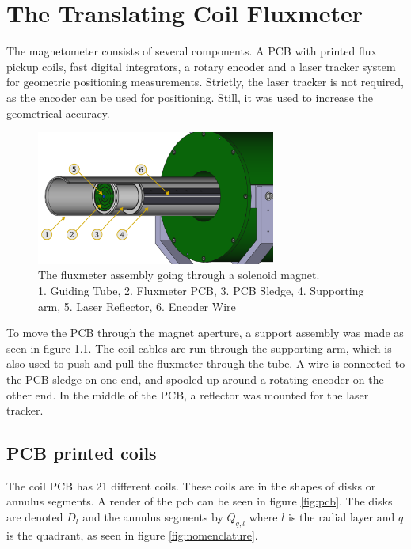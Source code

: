 \chapter{The Translating Coil Fluxmeter}
The magnetometer consists of several components. A PCB with 
printed flux pickup coils, fast digital integrators, a rotary
encoder and a laser tracker system for geometric positioning measurements.
Strictly, the laser tracker is not required, as the encoder can be used
for positioning. Still, it was used to increase
the geometrical accuracy.

\begin{figure}[!h]
    \centering
    \includegraphics[width=0.7\textwidth]{figs/elena}
    \caption{The fluxmeter assembly going through a solenoid magnet. \\
    1. Guiding Tube, 2. Fluxmeter PCB, 3. PCB Sledge, 4. Supporting arm, 
    5. Laser Reflector, 6. Encoder Wire}
    \label{fig:elena}
\end{figure}

To move the PCB through the magnet aperture, a support assembly was made as
seen in figure \ref{fig:elena}. The coil cables are run through the supporting
arm, which is also used to push and pull the fluxmeter through the tube. A 
wire is connected to the PCB sledge on one end, and spooled up around
a rotating encoder on the other end. In the middle of the PCB, a 
reflector was mounted for the laser tracker.

\section{PCB printed coils}
The coil PCB has 21 different coils.
These coils are in the shapes of disks or annulus segments.
A render of the pcb can be seen in figure
\ref{fig:pcb}. The disks are denoted $D_l$ and the 
annulus segments by $Q_{q, l}$ where $l$ is the radial layer and 
$q$ is the quadrant, as seen in figure \ref{fig:nomenclature}.

